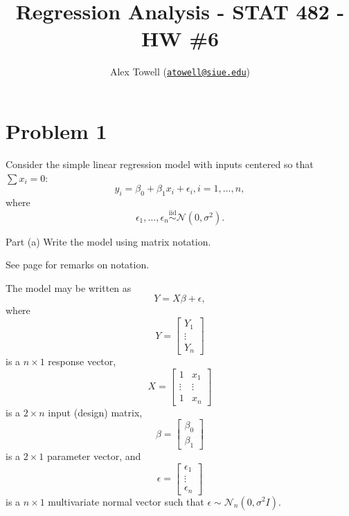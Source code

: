 \documentclass[
]{article}
\title{Regression Analysis - STAT 482 - HW \#6}
\author{Alex Towell
(\href{mailto:atowell@siue.edu}{\nolinkurl{atowell@siue.edu}})}
\date{}
\begin{document}
\maketitle

\newcommand{\sos}[1]{\mathrm{SS_{#1}}}
\newcommand{\ms}[1]{\mathrm{MS_{#1}}}
\newcommand{\sd}{\operatorname{sd}}
\newcommand{\var}{\operatorname{var}}
\newcommand{\expect}{\operatorname{E}}
\newcommand{\corr}{\operatorname{cor}}
\newcommand{\cov}{\operatorname{cov}}
\newcommand{\se}{\operatorname{se}}
\newcommand{\eval}[2]{\left. #1 \right\vert_{#2}}
\newcommand{\degf}[1]{\mathrm{df_{#1}}}

\hypertarget{problem-1}{%
\section{Problem 1}\label{problem-1}}

Consider the simple linear regression model with inputs centered so that
\(\sum x_i = 0\): \[
  y_i = \beta_0 + \beta_1 x_i + \epsilon_i, i=1,\ldots,n,
\] where \[
  \epsilon_1,\ldots,\epsilon_n \overset{\text{iid}} \sim \mathcal{N}(0,\sigma^2).
\]

\begin{tcolorbox}[split=\f]
Part (a)
\tcblower
Write the model using matrix notation.
\end{tcolorbox}

See page \pageref{sec:notation} for remarks on notation.

The model may be written as \[
  Y = X \beta + \epsilon,
\] where \[
  Y =
  \begin{bmatrix}
    Y_1\\
    \vdots\\
    Y_n
  \end{bmatrix}
\] is a \(n \times 1\) response vector, \[
  X =
  \begin{bmatrix}
    1 & x_1\\
    \vdots & \vdots\\
    1 & x_n
   \end{bmatrix}
\] is a \(2 \times n\) input (design) matrix, \[
  \beta =
  \begin{bmatrix}
     \beta_0\\
     \beta_1
  \end{bmatrix}
\] is a \(2 \times 1\) parameter vector, and \[
  \epsilon =
  \begin{bmatrix}
    \epsilon_1\\
    \vdots\\
    \epsilon_n
  \end{bmatrix}
\] is a \(n \times 1\) multivariate normal vector such that
\(\epsilon \sim \mathcal{N}_n(0,\sigma^2 I)\).
\end{document}
